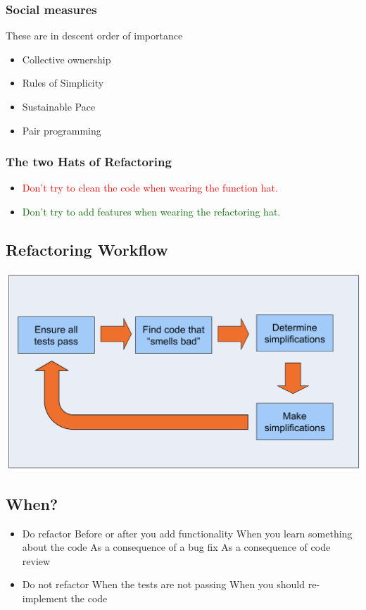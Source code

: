 \documentclass[10pt]{article}
\begin{document}
	\subsubsection{Social measures}
	These are in descent order of importance
	\begin{itemize}
		\item Collective ownership 
		\item Rules of Simplicity
		\item Sustainable Pace
		\item Pair programming
	\end{itemize}
	\subsubsection{The two Hats of Refactoring}
	\begin{itemize}
		\item \textcolor{red}{Don't try to clean the code when wearing the function hat.}
		\item \textcolor{darkgreen}{Don't try to add features when wearing the refactoring hat.}
	\end{itemize}
	\subsection{Refactoring Workflow}
	\begin{center}
		\includegraphics[scale=0.4]{assets/refactoring_workflow.png}
	\end{center}
	
	\subsection{When?}
	\begin{itemize}
		\item Do refactor
			\subitem Before or after you add functionality
			\subitem When you learn something about the code 
			\subitem As a consequence of a bug fix
			\subitem As a consequence of code review
		\item Do not refactor
			\subitem When the tests are not passing
			\subitem When you should re-implement the code 
	\end{itemize}
\end{document}
